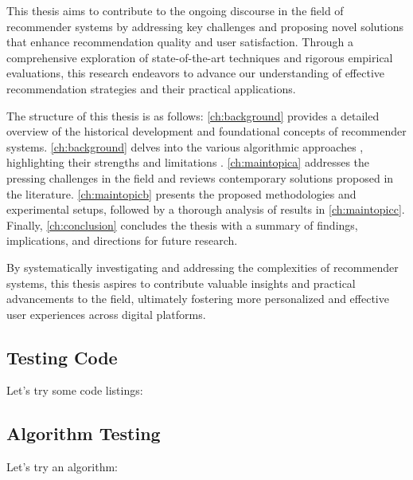 This thesis aims to contribute to the ongoing discourse in the field of recommender systems by addressing key challenges and proposing novel solutions that enhance recommendation quality and user satisfaction. Through a comprehensive exploration of state-of-the-art techniques and rigorous empirical evaluations, this research endeavors to advance our understanding of effective recommendation strategies and their practical applications.

The structure of this thesis is as follows: \autoref{ch:background} provides a detailed overview of the historical development and foundational concepts of recommender systems. \autoref{ch:background} delves into the various algorithmic approaches \autocite{cormen:2001}, highlighting their strengths and limitations \autocite{knuth:1974}. \autoref{ch:maintopica} addresses the pressing challenges in the field and reviews contemporary solutions proposed in the literature. \autoref{ch:maintopicb} presents the proposed methodologies and experimental setups, followed by a thorough analysis of results in \autoref{ch:maintopicc}. Finally, \autoref{ch:conclusion} concludes the thesis with a summary of findings, implications, and directions for future research.

By systematically investigating and addressing the complexities of recommender systems, this thesis aspires to contribute valuable insights and practical advancements to the field, ultimately fostering more personalized and effective user experiences across digital platforms.

\subsection{Testing Code}
Let's try some code listings:




\subsection{Algorithm Testing}
Let's try an algorithm:

\begin{algorithm}
	\begin{algorithmic}[1]
	 
	  \State{}%
	  \Return{}
	\EndIf
	 
	  
	\EndFunction                           
	\end{algorithmic}
\end{algorithm}
	